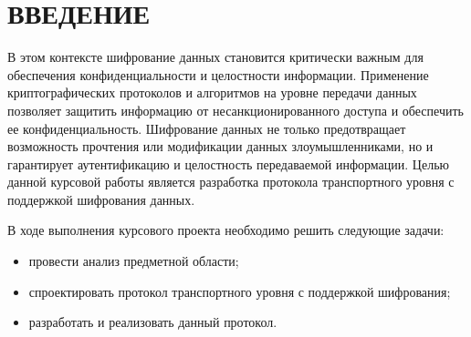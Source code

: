 \section*{ВВЕДЕНИЕ}

В этом контексте шифрование данных становится критически важным для обеспечения конфиденциальности и целостности информации. Применение криптографических протоколов и алгоритмов на уровне передачи данных позволяет защитить информацию от несанкционированного доступа и обеспечить ее конфиденциальность. Шифрование данных не только предотвращает возможность прочтения или модификации данных злоумышленниками, но и гарантирует аутентификацию и целостность передаваемой информации. Целью данной курсовой работы является разработка протокола транспортного уровня с поддержкой шифрования данных.

В ходе выполнения курсового проекта необходимо решить следующие задачи:

\begin{itemize}
	\item провести анализ предметной области;
	\item спроектировать протокол транспортного уровня с поддержкой шифрования;
	\item разработать и реализовать данный протокол.
\end{itemize}

\pagebreak
